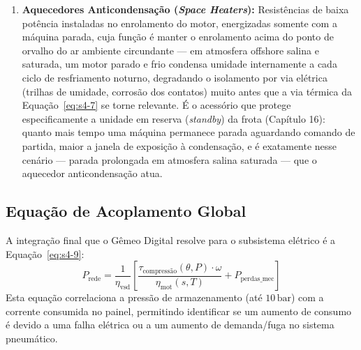 \documentclass[12pt,a4paper]{article}
\numberwithin{equation}{section}
\numberwithin{table}{section}
\numberwithin{figure}{section}
\begin{document}
{\begin{enumerate}
\begin{itemize}
			\item \textbf{Mitigação (acessórios):} Rolamento isolado eletricamente no lado oposto ao acoplamento (\textit{Non-Drive End}), anel de aterramento de eixo (\textit{shaft grounding ring}) que oferece um caminho de descarga de baixa impedância alternativo ao rolamento, e filtro de modo comum na saída do VSD.
		\end{itemize}
		\item \textbf{Aquecedores Anticondensação (\textit{Space Heaters}):} Resistências de baixa potência instaladas no enrolamento do motor, energizadas somente com a máquina parada, cuja função é manter o enrolamento acima do ponto de orvalho do ar ambiente circundante — em atmosfera offshore salina e saturada, um motor parado e frio condensa umidade internamente a cada ciclo de resfriamento noturno, degradando o isolamento por via elétrica (trilhas de umidade, corrosão dos contatos) muito antes que a via térmica da Equação~\eqref{eq:s4-7} se torne relevante. É o acessório que protege especificamente a unidade em reserva (\textit{standby}) da frota (Capítulo 16): quanto mais tempo uma máquina permanece parada aguardando comando de partida, maior a janela de exposição à condensação, e é exatamente nesse cenário — parada prolongada em atmosfera salina saturada — que o aquecedor anticondensação atua.
	\end{enumerate}

	\subsection{\textbf{Equação de Acoplamento Global}}
	A integração final que o Gêmeo Digital resolve para o subsistema elétrico é a Equação~\eqref{eq:s4-9}:
	\begin{equation}\label{eq:s4-9}
 P_{\text{rede}} = \frac{1}{\eta_{\text{vsd}}} \left[ \frac{\tau_{\text{compressão}}(\theta, P) \cdot \omega}{\eta_{\text{mot}}(s, T)} + P_{\text{perdas\_mec}} \right]
\end{equation}
	Esta equação correlaciona a pressão de armazenamento (até $10\,\text{bar}$) com a corrente consumida no painel, permitindo identificar se um aumento de consumo é devido a uma falha elétrica ou a um aumento de demanda/fuga no sistema pneumático.

}
\end{document}
